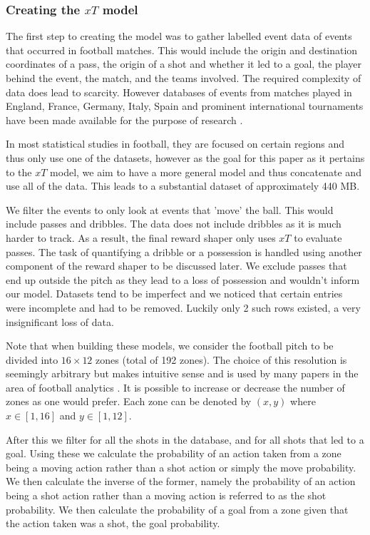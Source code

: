 \documentclass[11pt]{article}
\begin{document}
\subsubsection{Creating the $xT$ model}

The first step to creating the model was to gather labelled event data of events that occurred in football matches. This would include the origin and destination coordinates of a pass, the origin of a shot and whether it led to a goal, the player behind the event, the match, and the teams involved. The required complexity of data does lead to scarcity. However databases of events from matches played in England, France, Germany, Italy, Spain and prominent international tournaments have been made available for the purpose of research \cite{wyscout_data_2019}.

In most statistical studies in football, they are focused on certain regions and thus only use one of the datasets, however as the goal for this paper as it pertains to the $xT$ model, we aim to have a more general model and thus concatenate and use all of the data. This leads to a substantial dataset of approximately 440 MB. 

We filter the events to only look at events that 'move' the ball. This would include passes and dribbles. The data does not include dribbles as it is much harder to track. As a result, the final reward shaper only uses $xT$ to evaluate passes. The task of quantifying a dribble or a possession is handled using another component of the reward shaper to be discussed later. We exclude passes that end up outside the pitch as they lead to a loss of possession and wouldn't inform our model. Datasets tend to be imperfect and we noticed that certain entries were incomplete and had to be removed. Luckily only 2 such rows existed, a very insignificant loss of data.

Note that when building these models, we consider the football pitch to be divided into $16 \times 12$ zones (total of 192 zones). The choice of this resolution is seemingly arbitrary but makes intuitive sense and is used by many papers in the area of football analytics \cite{karun_introducing_2019}. It is possible to increase or decrease the number of zones as one would prefer. Each zone can be denoted by $(x, y)$ where $x \in [1, 16]$ and $y \in [1, 12]$.

After this we filter for all the shots in the database, and for all shots that led to a goal. Using these we calculate the probability of an action taken from a zone being a moving action rather than a shot action or simply the move probability. We then calculate the inverse of the former, namely the probability of an action being a shot action rather than a moving action is referred to as the shot probability.
We then calculate the probability of a goal from a zone given that the action taken was a shot, the goal probability.
\end{document}
